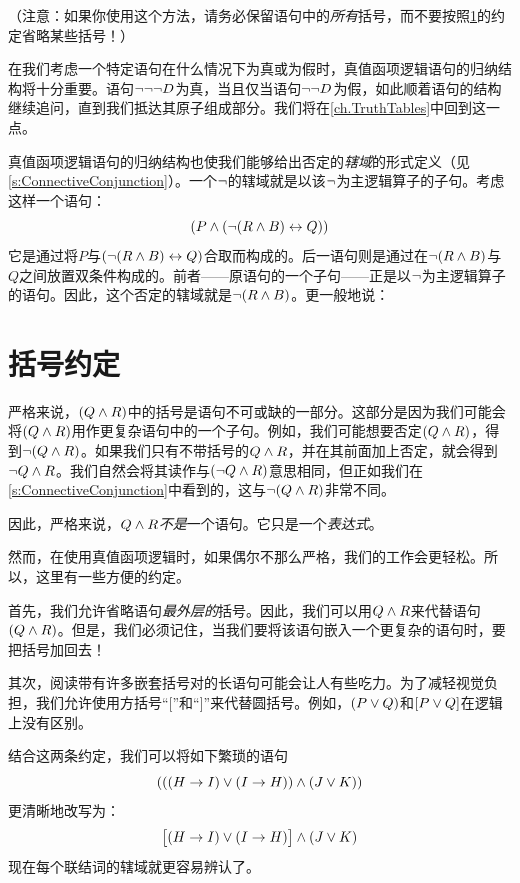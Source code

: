 （注意：如果你使用这个方法，请务必保留语句中的\emph{所有}括号，而不要按照\cref{TFLconventions}的约定省略某些括号！）

在我们考虑一个特定语句在什么情况下为真或为假时，真值函项逻辑语句的归纳结构将十分重要。语句$\neg \neg \neg D$为真，当且仅当语句$\neg \neg D$为假，如此顺着语句的结构继续追问，直到我们抵达其原子组成部分。我们将在\cref{ch.TruthTables}中回到这一点。

真值函项逻辑语句的归纳结构也使我们能够给出否定的\emph{辖域}的形式定义（见\cref{s:ConnectiveConjunction}）。一个$\neg$的辖域就是以该$\neg$为主逻辑算子的子句。考虑这样一个语句：
$$(P \wedge (\neg (R \wedge B) \leftrightarrow Q))$$
它是通过将$P$与$ (\neg (R \wedge B) \leftrightarrow Q)$合取而构成的。后一语句则是通过在$\neg (R \wedge B)$与$Q$之间放置双条件构成的。前者——原语句的一个子句——正是以$\neg$为主逻辑算子的语句。因此，这个否定的辖域就是$\neg(R \wedge B)$。更一般地说：

\section{括号约定}
\label{TFLconventions}
严格来说，$(Q \wedge R)$中的括号是语句不可或缺的一部分。这部分是因为我们可能会将$(Q \wedge R)$用作更复杂语句中的一个子句。例如，我们可能想要否定$(Q \wedge R)$，得到$\neg(Q \wedge R)$。如果我们只有不带括号的$Q \wedge R$，并在其前面加上否定，就会得到$\neg Q \wedge R$。我们自然会将其读作与$(\neg Q \wedge R)$意思相同，但正如我们在\cref{s:ConnectiveConjunction}中看到的，这与$\neg(Q\wedge R)$非常不同。

因此，严格来说，$Q \wedge R$\emph{不是}一个语句。它只是一个\emph{表达式}。

然而，在使用真值函项逻辑时，如果偶尔不那么严格，我们的工作会更轻松。所以，这里有一些方便的约定。

首先，我们允许省略语句\emph{最外层的}括号。因此，我们可以用$Q \wedge R$来代替语句$(Q \wedge R)$。但是，我们必须记住，当我们要将该语句嵌入一个更复杂的语句时，要把括号加回去！

其次，阅读带有许多嵌套括号对的长语句可能会让人有些吃力。为了减轻视觉负担，我们允许使用方括号“[”和“]”来代替圆括号。例如，$(P\vee Q)$和$[P\vee Q]$在逻辑上没有区别。

结合这两条约定，我们可以将如下繁琐的语句
$$(((H \rightarrow I) \vee (I \rightarrow H)) \wedge (J \vee K))$$
更清晰地改写为：
$$\bigl[(H \rightarrow I) \vee (I \rightarrow H)\bigr] \wedge (J \vee K)$$
现在每个联结词的辖域就更容易辨认了。

\practiceproblems

